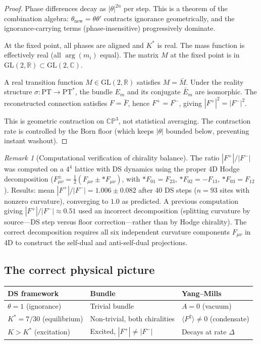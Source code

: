 \documentclass[11pt,a4paper]{article}
\theoremstyle{definition}
\theoremstyle{remark}
\newtheorem{remark}[theorem]{Remark}
\newcommand{\CP}{\mathbb{CP}}
\newcommand{\C}{\mathbb{C}}
\newcommand{\R}{\mathbb{R}}
\newcommand{\GL}{\mathrm{GL}}
\newcommand{\PT}{\mathrm{PT}}
\begin{document}
\begin{proof}
Phase differences decay as $|\theta|^{2n}$ per step. This is a theorem of the combination algebra: $\theta_{\mathrm{new}}=\theta\theta'$ contracts ignorance geometrically, and the ignorance-carrying terms (phase-insensitive) progressively dominate.

At the fixed point, all phases are aligned and $K^*$ is real. The mass function is effectively real (all $\arg(m_i)$ equal). The matrix $M$ at the fixed point is in $\GL(2,\R)\subset\GL(2,\C)$.

A real transition function $M\in\GL(2,\R)$ satisfies $M=\bar{M}$. Under the reality structure $\sigma:\PT\to\PT^*$, the bundle $E_m$ and its conjugate $\bar{E}_m$ are isomorphic. The reconstructed connection satisfies $F=\bar{F}$, hence $F^+=\overline{F^-}$, giving $|F^+|^2=|F^-|^2$.

This is geometric contraction on $\CP^3$, not statistical averaging. The contraction rate is controlled by the Born floor (which keeps $|\theta|$ bounded below, preventing instant washout).
\end{proof}

\begin{remark}[Computational verification of chirality balance]\label{rem:chirality_verified}
The ratio $|F^+|/|F^-|$ was computed on a $4^4$ lattice with DS dynamics using the proper 4D Hodge decomposition ($F^\pm_{\mu\nu}=\frac{1}{2}(F_{\mu\nu}\pm{*}F_{\mu\nu})$, with ${*}F_{01}=F_{23}$, ${*}F_{02}=-F_{13}$, ${*}F_{03}=F_{12}$). Results: mean $|F^+|/|F^-|=1.006\pm 0.082$ after 40 DS steps ($n=93$ sites with nonzero curvature), converging to $1.0$ as predicted. A previous computation giving $|F^+|/|F^-|\approx 0.51$ used an incorrect decomposition (splitting curvature by source---DS step versus floor correction---rather than by Hodge chirality). The correct decomposition requires all six independent curvature components $F_{\mu\nu}$ in 4D to construct the self-dual and anti-self-dual projections.
\end{remark}


\subsection{The correct physical picture}

\begin{center}
\begin{tabular}{lll}
\toprule
DS framework & Bundle & Yang--Mills \\
\midrule
$\theta=1$ (ignorance) & Trivial bundle & $A=0$ (vacuum) \\
$K^*=7/30$ (equilibrium) & Non-trivial, both chiralities & $\langle F^2\rangle\neq 0$ (condensate) \\
$K>K^*$ (excitation) & Excited, $|F^+|\neq|F^-|$ & Decays at rate $\Delta$ \\
\bottomrule
\end{tabular}
\end{center}
\end{document}
